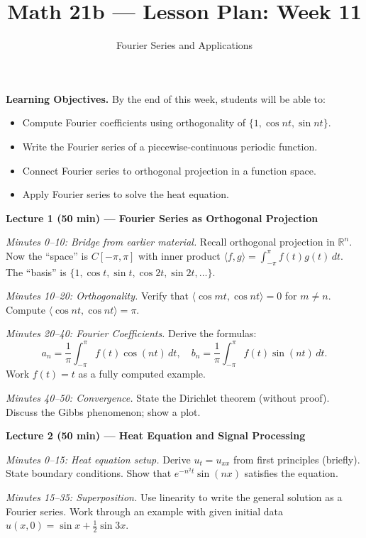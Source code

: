 \documentclass{amsart}
\title{Math 21b --- Lesson Plan: Week 11}
\subtitle{Fourier Series and Applications}
\date{}
\begin{document}
\maketitle

\textbf{Learning Objectives.} By the end of this week, students will be able to:
\begin{itemize}
    \item Compute Fourier coefficients using orthogonality of $\{1, \cos nt, \sin nt\}$.
    \item Write the Fourier series of a piecewise-continuous periodic function.
    \item Connect Fourier series to orthogonal projection in a function space.
    \item Apply Fourier series to solve the heat equation.
\end{itemize}

\bigskip

\textbf{Lecture 1 (50 min) --- Fourier Series as Orthogonal Projection}

\textit{Minutes 0--10: Bridge from earlier material.} Recall orthogonal projection in $\mathbb{R}^n$. Now the ``space'' is $C[-\pi,\pi]$ with inner product $\langle f,g \rangle = \int_{-\pi}^{\pi}f(t)g(t)\,dt$. The ``basis'' is $\{1, \cos t, \sin t, \cos 2t, \sin 2t, \ldots\}$.

\textit{Minutes 10--20: Orthogonality.} Verify that $\langle \cos mt, \cos nt \rangle = 0$ for $m \neq n$. Compute $\langle \cos nt, \cos nt \rangle = \pi$.

\textit{Minutes 20--40: Fourier Coefficients.} Derive the formulas:
\[
a_n = \frac{1}{\pi}\int_{-\pi}^{\pi}f(t)\cos(nt)\,dt, \quad b_n = \frac{1}{\pi}\int_{-\pi}^{\pi}f(t)\sin(nt)\,dt.
\]
Work $f(t) = t$ as a fully computed example.

\textit{Minutes 40--50: Convergence.} State the Dirichlet theorem (without proof). Discuss the Gibbs phenomenon; show a plot.

\bigskip

\textbf{Lecture 2 (50 min) --- Heat Equation and Signal Processing}

\textit{Minutes 0--15: Heat equation setup.} Derive $u_t = u_{xx}$ from first principles (briefly). State boundary conditions. Show that $e^{-n^2 t}\sin(nx)$ satisfies the equation.

\textit{Minutes 15--35: Superposition.} Use linearity to write the general solution as a Fourier series. Work through an example with given initial data $u(x,0) = \sin x + \frac{1}{2}\sin 3x$.
\end{document}
